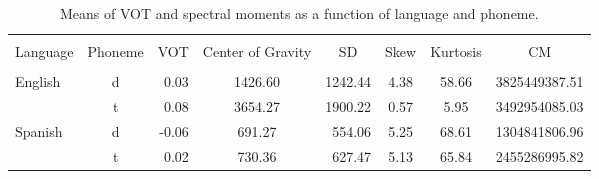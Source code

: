 \begin{table*}[t]
\centering
\begin{tabular}{@{}lcrcrccr@{}}
	\hline \\ [-1ex]
	Language & Phoneme & VOT & Center of Gravity & \multicolumn{1}{c}{SD} & Skew & Kurtosis & \multicolumn{1}{c}{CM} \\ [1ex]
	\hline \\ [-1ex]
	\multirow{2}{*}{English} & d & 0.03 & 1426.60 & 1242.44 & 4.38 & 58.66 & 3825449387.51 \\ 
   							 & t & 0.08 & 3654.27 & 1900.22 & 0.57 & 5.95 & 3492954085.03 \\ [1ex]
	\multirow{2}{*}{Spanish} & d & -0.06 & 691.27 & 554.06 & 5.25 & 68.61 & 1304841806.96 \\ 
   							 & t & 0.02 & 730.36 & 627.47 & 5.13 & 65.84 & 2455286995.82 \\ [1ex]
   \hline
\end{tabular}
\caption{Means of VOT and spectral moments as a function of language and phoneme.}
\end{table*}
